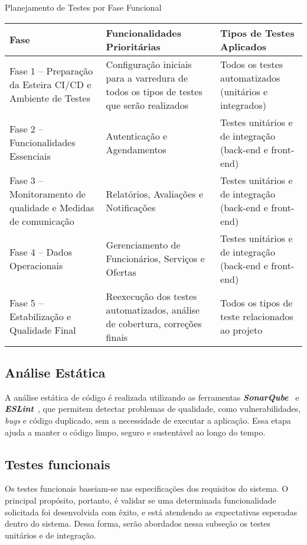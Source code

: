 \begin{quadro}[htbp]
	\centering
	\caption{Planejamento de Testes por Fase Funcional}
	\label{quad:planejamento-testes}
	\begin{tabularx}{\textwidth}{|p{5cm}|X|X|}
		\hline
		\textbf{Fase} & 
		\textbf{Funcionalidades Prioritárias} & 
		\textbf{Tipos de Testes Aplicados} \\
		\hline
		Fase 1 – Preparação da Esteira CI/CD e Ambiente de Testes & 
		Configuração iniciais para a varredura de todos os tipos de testes que serão realizados &
		Todos os testes automatizados (unitários e integrados)
		\\
		\hline
		Fase 2 – Funcionalidades Essenciais & 
		Autenticação e Agendamentos & 
		Testes unitários e de integração (back-end e front-end) \\
		\hline
		Fase 3 – Monitoramento de qualidade e Medidas de comunicação & 
		Relatórios, Avaliações e Notificações & 
		Testes unitários e de integração (back-end e front-end) \\
		\hline
		Fase 4 – Dados Operacionais & 
		Gerenciamento de Funcionários, Serviços e Ofertas & 
		Testes unitários e de integração (back-end e front-end) \\
		\hline
		Fase 5 – Estabilização e Qualidade Final & 
		Reexecução dos testes automatizados, análise de cobertura, correções finais & 
		Todos os tipos de teste relacionados ao projeto \\
		\hline
	\end{tabularx}
\end{quadro}


\subsection{Análise Estática}
A análise estática de código é realizada utilizando as ferramentas \textbf{\textit{SonarQube}}~\cite{sonarqube-2025} e \textbf{\textit{ESLint}}~\cite{eslint-2025}, 
que permitem detectar problemas de qualidade, como vulnerabilidades, \textit{bugs} e código duplicado, sem a necessidade de executar a aplicação. Essa etapa ajuda a manter o código limpo, seguro e sustentável ao longo do tempo.

\subsection{Testes funcionais}
Os testes funcionais baseiam-se nas especificações dos requisitos do sistema. O principal propósito, portanto, é validar se uma determinada funcionalidade solicitada foi desenvolvida com êxito, e está atendendo as expectativas esperadas dentro do sistema. Dessa forma, serão abordados nessa subseção os testes unitários e de integração.

